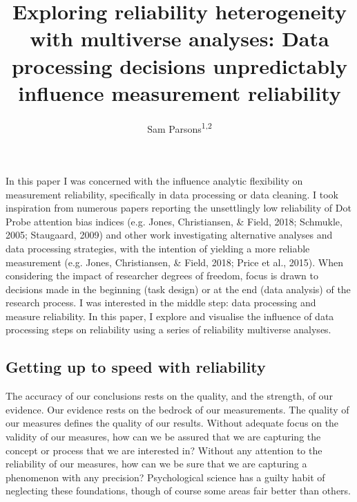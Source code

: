 \documentclass[
  english,
  man,floatsintext]{apa6}
\title{Exploring reliability heterogeneity with multiverse analyses: Data processing decisions unpredictably influence measurement reliability}
\author{Sam Parsons\textsuperscript{1,2}}
\date{}
\affiliation{\vspace{0.5cm}\textsuperscript{1} University of Oxford\\\textsuperscript{2} Radboud University Medical Center}
\begin{document}
\maketitle

In this paper I was concerned with the influence analytic flexibility on measurement reliability, specifically in data processing or data cleaning. I took inspiration from numerous papers reporting the unsettlingly low reliability of Dot Probe attention bias indices (e.g. Jones, Christiansen, \& Field, 2018; Schmukle, 2005; Staugaard, 2009) and other work investigating alternative analyses and data processing strategies, with the intention of yielding a more reliable measurement (e.g. Jones, Christiansen, \& Field, 2018; Price et al., 2015). When considering the impact of researcher degrees of freedom, focus is drawn to decisions made in the beginning (task design) or at the end (data analysis) of the research process. I was interested in the middle step: data processing and measure reliability. In this paper, I explore and visualise the influence of data processing steps on reliability using a series of reliability multiverse analyses.

\hypertarget{getting-up-to-speed-with-reliability}{%
\subsection{Getting up to speed with reliability}\label{getting-up-to-speed-with-reliability}}

The accuracy of our conclusions rests on the quality, and the strength, of our evidence. Our evidence rests on the bedrock of our measurements. The quality of our measures defines the quality of our results. Without adequate focus on the validity of our measures, how can we be assured that we are capturing the concept or process that we are interested in? Without any attention to the reliability of our measures, how can we be sure that we are capturing a phenomenon with any precision? Psychological science has a guilty habit of neglecting these foundations, though of course some areas fair better than others.
\end{document}
